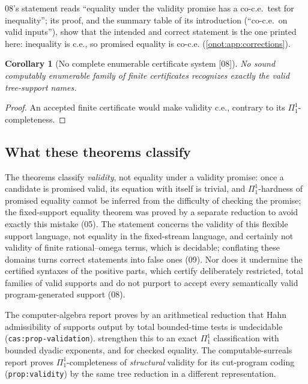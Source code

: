 \documentclass[11pt,oneside]{article}
\numberwithin{equation}{section}
\newtheorem{corollary}[corollary]{Corollary}
\theoremstyle{definition}
\theoremstyle{remark}
\newcommand{\src}[1]{\textup{\textsf{\small[#1]}}}
\newcommand{\replabel}[1]{\nolinkurl{#1}}
\begin{document}
08's statement reads ``equality under the validity promise has a co-c.e.\ test for
inequality''; its proof, and the summary table of its introduction (``co-c.e.\ on
valid inputs''), show that the intended and correct statement is the one printed
here: inequality is c.e., so promised equality is co-c.e. (\cref{onot:app:corrections}).

\begin{corollary}[No complete enumerable certificate system \src{08}]\label{onot:neg:cor:nocertificates}
No sound computably enumerable family of finite certificates recognizes exactly
the valid tree-support names.
\end{corollary}
\begin{proof}
An accepted finite certificate would make validity c.e., contrary to its
$\Pi^1_1$-completeness.
\end{proof}

\subsection{What these theorems classify}

The theorems classify \emph{validity}, not equality under a validity promise: once a
candidate is promised valid, its equation with itself is trivial, and
$\Pi^1_1$-hardness of promised equality cannot be inferred from the difficulty of
checking the promise; the fixed-support equality theorem was proved by a separate
reduction to avoid exactly this mistake (05). The statement concerns the validity
of this flexible support language, not equality in the fixed-stream language, and
certainly not validity of finite rational--omega terms, which is decidable;
conflating these domains turns correct statements into false ones (09). Nor does it
undermine the certified syntaxes of the positive parts, which certify deliberately
restricted, total families of valid supports and do not purport to accept every
semantically valid program-generated support (08).

The computer-algebra report proves by an arithmetical reduction that Hahn
admissibility of supports output by total bounded-time tests is undecidable
(\replabel{cas:prop-validation}). 
strengthen this to an exact $\Pi^1_1$ classification with bounded dyadic
exponents, and for checked equality. The computable-surreals report proves
$\Pi^1_1$-completeness of \emph{structural} validity for its cut-program coding
(\replabel{prop:validity}) by the same tree reduction in a different
representation.
\end{document}
